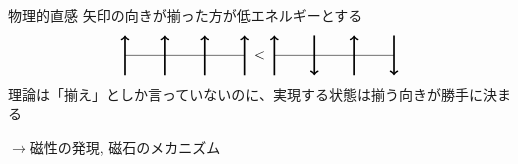 \documentclass[dvipdfm]{beamer}
\begin{document}
\begin{frame}{物理的直感}
    矢印の向きが揃った方が低エネルギーとする
    \begin{equation*}
        \vcenter{\hbox{
            \begin{tikzpicture}
                \draw(0,0)--(3,0);
                \foreach\x in{0,1,...,3}{
                    \draw[->, very thick](\x,-.5)--(\x,.5);
                }
            \end{tikzpicture}
        }}
        <
        \vcenter{\hbox{
            \begin{tikzpicture}
                \draw(0,0)--(3,0);
                \draw[->, very thick](0,-.5)--++(0,1);
                \draw[->, very thick](1,.5)--++(0,-1);
                \draw[->, very thick](2,-.5)--++(0,1);
                \draw[->, very thick](3,.5)--++(0,-1);
            \end{tikzpicture}
        }}
    \end{equation*}
    理論は「揃え」としか言っていないのに、実現する状態は揃う向きが勝手に決まる

    $\rightarrow$磁性の発現, 磁石のメカニズム
\end{frame}
\end{document}
